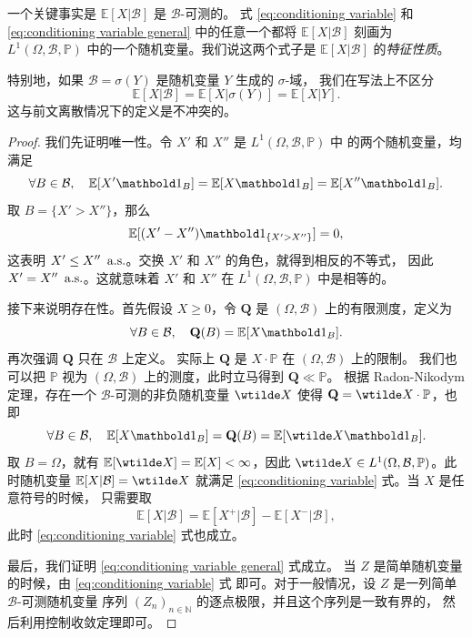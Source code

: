 一个关键事实是 $\mathbb{E}[X|\mathcal{B}]$ 是 $\mathcal{B}$-可测的。
式 \eqref{eq:conditioning variable} 和 \eqref{eq:conditioning variable general}
中的任意一个都将 $\mathbb{E}[X|\mathcal{B}]$ 刻画为 $L^1(\Omega,\mathcal{B},\mathbb{P})$
中的一个随机变量。我们说这两个式子是 $\mathbb{E}[X|\mathcal{B}]$ 的\emph{特征性质}。

特别地，如果 $\mathcal{B}=\sigma(Y)$ 是随机变量 $Y$ 生成的 $\sigma$-域，
我们在写法上不区分
\[
  \mathbb{E}[X| \mathcal{B}] = \mathbb{E}[X|\sigma(Y)]
  =\mathbb{E}[X|Y].
\]
这与前文离散情况下的定义是不冲突的。

\begin{proof}
  我们先证明唯一性。令 $X'$ 和 $X''$ 是 $L^1(\Omega,\mathcal{B},\mathbb{P})$ 中
  的两个随机变量，均满足
  \[
    \forall B\in \mathcal{B},\quad
    \mathbb{E}[X'\idf_{B}]=\mathbb{E}[X\idf_{B}]=\mathbb{E}[X''\idf_{B}].
  \]
  取 $B=\{X'> X''\}$，那么
  \[
    \mathbb{E}[(X'-X'')\idf_{\{X'>X''\}}]=0,
  \]
  这表明 $X'\leq X''\,\text{$$ a.s.}$。交换 $X'$ 和 $X''$ 的角色，就得到相反的不等式，
  因此 $X'=X''\,\text{$$ a.s.}$。这就意味着 $X'$ 和 $X''$ 在 $L^1(\Omega,\mathcal{B},\mathbb{P})$
  中是相等的。

  接下来说明存在性。首先假设 $X\geq 0$，令 $\mathbf{Q}$ 是 $(\Omega,\mathcal{B})$
  上的有限测度，定义为
  \[
    \forall B\in \mathcal{B},\quad \mathbf{Q}(B)=\mathbb{E}[X\idf_{B}].
  \]
  再次强调 $\mathbf{Q}$ 只在 $\mathcal{B}$ 上定义。
  实际上 $\mathbf{Q}$ 是 $X\cdot \mathbb{P}$ 在 $(\Omega,\mathcal{B})$ 上的限制。
  我们也可以把 $\mathbb{P}$
  视为 $(\Omega,\mathcal{B})$ 上的测度，此时立马得到 $\mathbf{Q}\ll \mathbb{P}$。
  根据 Radon-Nikodym 定理，存在一个 $\mathcal{B}$-可测的非负随机变量 $\wtilde X$
  使得 $\mathbf{Q}=\wtilde X \cdot \mathbb{P}$，也即
  \[
    \forall B\in \mathcal{B},\quad 
    \mathbb{E}[X\idf_B]=\mathbf{Q}(B)
    =\mathbb{E}[\wtilde X\idf_B].
  \]
  取 $B=\Omega$，就有 $\mathbb{E}[\wtilde X]=\mathbb{E}[X]<\infty$，因此
  $\wtilde X\in L^1(\Omega,\mathcal{B},\mathbb{P})$。此时随机变量 $\mathbb{E}[X|\mathcal{B}]=\wtilde X$
  就满足 \eqref{eq:conditioning variable} 式。当 $X$ 是任意符号的时候，
  只需要取
  \[
    \mathbb{E}[X|\mathcal{B}]=\mathbb{E}[X^+|\mathcal{B}]-\mathbb{E}[X^-|\mathcal{B}],
  \]
  此时 \eqref{eq:conditioning variable} 式也成立。

  最后，我们证明 \eqref{eq:conditioning variable general} 式成立。
  当 $Z$ 是简单随机变量的时候，由 \eqref{eq:conditioning variable} 式
  即可。对于一般情况，设 $Z$ 是一列简单 $\mathcal{B}$-可测随机变量
  序列 $(Z_n)_{n\in \mathbb{N}}$ 的逐点极限，并且这个序列是一致有界的，
  然后利用控制收敛定理即可。
\end{proof}

